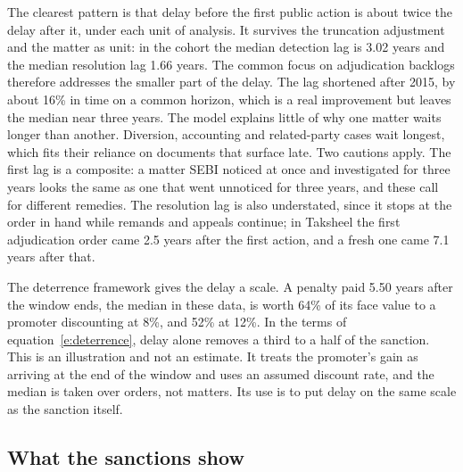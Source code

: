 \documentclass[letterpaper,11pt,leqno]{article}
\begin{document}
The clearest pattern is that delay before the first public action is about twice the delay after it, under each unit of analysis. It survives the truncation adjustment and the matter as unit: in the cohort the median detection lag is 3.02 years and the median resolution lag 1.66 years. The common focus on adjudication backlogs therefore addresses the smaller part of the delay. The lag shortened after 2015, by about 16\% in time on a common horizon, which is a real improvement but leaves the median near three years. The model explains little of why one matter waits longer than another. Diversion, accounting and related-party cases wait longest, which fits their reliance on documents that surface late. Two cautions apply. The first lag is a composite: a matter SEBI noticed at once and investigated for three years looks the same as one that went unnoticed for three years, and these call for different remedies. The resolution lag is also understated, since it stops at the order in hand while remands and appeals continue; in Taksheel the first adjudication order came 2.5 years after the first action, and a fresh one came 7.1 years after that.

The deterrence framework gives the delay a scale. A penalty paid 5.50 years after the window ends, the median in these data, is worth 64\% of its face value to a promoter discounting at 8\%, and 52\% at 12\%. In the terms of equation~\eqref{e:deterrence}, delay alone removes a third to a half of the sanction. This is an illustration and not an estimate. It treats the promoter's gain as arriving at the end of the window and uses an assumed discount rate, and the median is taken over orders, not matters. Its use is to put delay on the same scale as the sanction itself.

\subsection{What the sanctions show}
\end{document}
